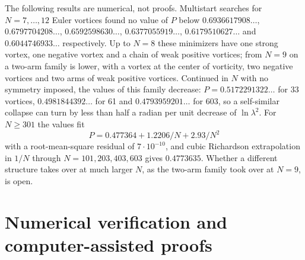\documentclass[11pt]{article}
\theoremstyle{definition}
\begin{document}
The following results are numerical, not proofs. Multistart searches for $N = 7, \dots, 12$ Euler vortices found no value of $P$ below $0.6936617908\ldots$, $0.6797704208\ldots$, $0.6592598630\ldots$, $0.6377055919\ldots$, $0.6179510627\ldots$ and $0.6044746933\ldots$ respectively. Up to $N = 8$ these minimizers have one strong vortex, one negative vortex and a chain of weak positive vortices; from $N = 9$ on a two-arm family is lower, with a vortex at the center of vorticity, two negative vortices and two arms of weak positive vortices. Continued in $N$ with no symmetry imposed, the values of this family decrease: $P = 0.5172291322\ldots$ for 33 vortices, $0.4981844392\ldots$ for 61 and $0.4793959201\ldots$ for 603, so a self-similar collapse can turn by less than half a radian per unit decrease of $\ln\lambda^2$. For $N \ge 301$ the values fit \[
 P = 0.477364 + 1.2206/N + 2.93/N^2
\]
with a root-mean-square residual of $7 \cdot 10^{-10}$, and cubic Richardson extrapolation in $1/N$ through $N = 101, 203, 403, 603$ gives $0.4773635$. Whether a different structure takes over at much larger $N$, as the two-arm family took over at $N = 9$, is open.

\section{Numerical verification and computer-assisted proofs}\label{sec:numerics}
\end{document}
